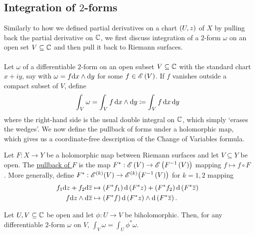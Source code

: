 \documentclass[../Moduli_Spaces_of_Riemann_Surfaces.tex]{subfiles}
\begin{document}
    \subsection{Integration of $2$-forms}
    Similarly to how we defined partial derivatives on a chart $\left(U,z\right)$ of $X$ by pulling back the partial derivative on $\mathbb{C}$, we first discuss integration of a $2$-form $\omega$ on an open set $V\subseteq\mathbb{C}$ and then pull it back to Riemann surfaces.\\\ \\
    Let $\omega$ of a differentiable $2$-form on an open subset $V\subseteq\mathbb{C}$ with the standard chart $x+iy$, say with $\omega=f\mathrm{d} x\wedge\mathrm{d} y$ for some $f\in\mathscr{E}\left(V\right)$. If $f$ vanishes outside a compact subset of $V$, define
    \begin{equation*}
        \int_V\omega=\int_Vf\,\mathrm{d} x\wedge\mathrm{d} y\coloneqq\int_Vf\,\mathrm{d} x\,\mathrm{d} y
    \end{equation*}
    where the right-hand side is the usual double integral on $\mathbb{C}$, which simply `erases the wedges'. We now define the pullback of forms under a holomorphic map, which gives us a coordinate-free description of the Change of Variables formula.
    \begin{definition}
        Let $F:X\to Y$ be a holomorphic map between Riemann surfaces and let $V\subseteq Y$ be open. The \ul{pullback of $F$} is the map $F^\ast:\mathscr{E}\left(V\right)\to\mathscr{E}\left(F^{-1}\left(V\right)\right)$ mapping $f\mapsto f\circ F$. More generally, define $F^\ast:\mathscr{E}^{\left(k\right)}\!\left(V\right)\to\mathscr{E}^{\left(k\right)}\!\left(F^{-1}\left(V\right)\right)$ for $k=1,2$ mapping
        \begin{equation*}
            \begin{aligned}
                f_1\mathrm{d} z+f_2\mathrm{d}\overline{z}&\mapsto\left(F^\ast f_1\right)\mathrm{d}\left(F^\ast z\right)+\left(F^\ast f_2\right)\mathrm{d}\left(F^\ast\overline{z}\right) \\
                f\mathrm{d} z\wedge\mathrm{d}\overline{z}&\mapsto\left(F^\ast f\right)\mathrm{d}\left(F^\ast z\right)\wedge\mathrm{d}\left(F^\ast\overline{z}\right).
            \end{aligned}
        \end{equation*}
    \end{definition}
    \begin{proposition}\label{CC:prp:change_of_variables_in_C}
        Let $U,V\subseteq\mathbb{C}$ be open and let $\phi:U\to V$ be biholomorphic. Then, for any differentiable $2$-form $\omega$ on $V$, $\int_V\omega=\int_U\phi^\ast\omega$.
    \end{proposition}
\end{document}
